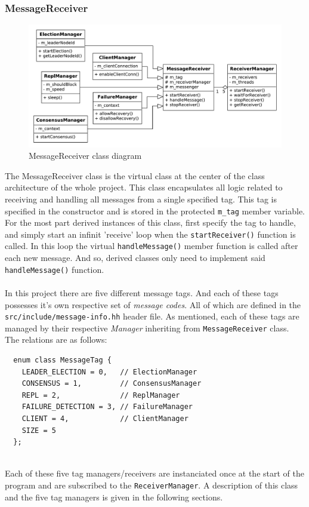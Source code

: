 \documentclass[11pt]{article}
\begin{document}
\subsubsection{MessageReceiver}
\begin{figure}[H]
  \centering
  \includegraphics[scale=0.5]{image/receiver.pdf}
  \caption{MessageReceiver class diagram}
\end{figure}
The MessageReceiver class is the virtual class at the center of the class
architecture of the whole project. This class encapsulates all logic related to
receiving and handling all messages from a single specified tag. This tag is
specified in the constructor and is stored in the protected \texttt{m\_tag}
member variable. For the most part derived instances of this class, first
specify the tag to handle, and simply start an infinit 'receive' loop when the
\texttt{startReceiver()} function is called. In this loop the virtual
\texttt{handleMessage()} member function is called after each new message. And
so, derived classes only need to implement said \texttt{handleMessage()}
function.\\\\ In this project there are five different message tags. And
each of these tags possesses it's own respective set of \textit{message
  codes}. All of which are defined in the \texttt{src/include/message-info.hh}
header file. As mentioned, each of these tags are managed by their respective
\textit{Manager} inheriting from \texttt{MessageReceiver} class. The relations
are as follows:\\
\begin{verbatim}
  enum class MessageTag {
    LEADER_ELECTION = 0,   // ElectionManager
    CONSENSUS = 1,         // ConsensusManager
    REPL = 2,              // ReplManager
    FAILURE_DETECTION = 3, // FailureManager
    CLIENT = 4,            // ClientManager
    SIZE = 5
  };
\end{verbatim}
\ \\
Each of these five tag managers/receivers are instanciated once at the start of
the program and are subscribed to the \texttt{ReceiverManager}. A description of
this class and the five tag managers is given in the following sections.
\end{document}
